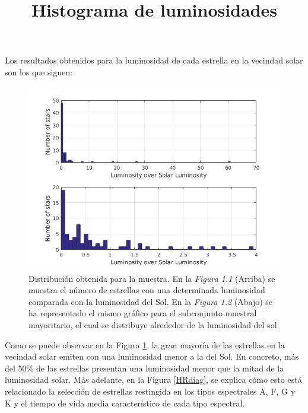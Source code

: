 \hspace*{12pt}Los resultados obtenidos para la luminosidad de cada estrella en la vecindad solar son los que siguen:

	\begin{figure}[!htbp]
		\centering
		\title{\textbf{Histograma de luminosidades}}
		\begin{center}
			\includegraphics[width=15cm]{Figures/Lhist.png}
		\end{center}
		\caption{\footnotesize{
		Distribuci\'{o}n obtenida para la muestra. En la \textit{Figura 1.1} (Arriba) se muestra el n\'{u}mero de estrellas con una determinada luminosidad comparada con la luminosidad del Sol. En la \textit{Figura 1.2} (Abajo) se ha representado el mismo gr\'{a}fico para el subconjunto muestral mayoritario, el cual se distribuye alrededor de la luminosidad del sol.}}
		\label{Lhist}
	\end{figure}

	Como se puede observar en la Figura \ref{Lhist}, la gran mayor\'{i}a de las estrellas en la vecindad solar emiten con una luminosidad menor a la del Sol. En concreto, m\'{a}s del 50\% de las estrellas presentan una luminosidad menor que la mitad de la luminosidad solar. M\'{a}s adelante, en la Figura \ref{HRdiag}, se explica c\'{o}mo esto est\'{a} relacionado la selecci\'{o}n de estrellas restingida en los tipos espectrales A, F, G y K y el tiempo de vida media caracter\'{i}stico de cada tipo espectral.
